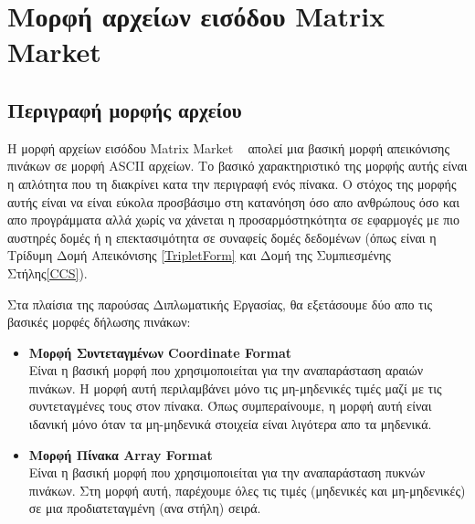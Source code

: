 
\chapter{Μορφή αρχείων εισόδου Matrix Market}
\label{ch:chapterMatrixMarketFormat}

\section {Περιγραφή μορφής αρχείου}
Η μορφή αρχείων εισόδου Matrix Market ~\cite{boisvert1996matrix} απολεί μια βασική μορφή απεικόνισης πινάκων σε μορφή  ASCII  αρχείων. Το βασικό χαρακτηριστικό της μορφής αυτής είναι η απλότητα που τη διακρίνει κατα την περιγραφή ενός πίνακα. Ο στόχος της μορφής αυτής είναι να είναι εύκολα προσβάσιμο στη κατανόηση όσο απο ανθρώπους όσο και απο προγράμματα αλλά χωρίς να χάνεται η προσαρμόστηκότητα σε εφαρμογές με πιο αυστηρές δομές ή η επεκτασιμότητα σε συναφείς δομές δεδομένων (όπως είναι η Τρίδυμη Δομή Απεικόνισης \ref{TripletForm} και Δομή της Συμπιεσμένης Στήλης\ref{CCS}).

Στα πλαίσια της παρούσας Διπλωματικής Εργασίας, θα εξετάσουμε δύο απο τις βασικές μορφές δήλωσης πινάκων:

\begin{itemize}
    \item \textbf{Μορφή Συντεταγμένων  Coordinate Format } \\
    Είναι η βασική μορφή που χρησιμοποιείται για την αναπαράσταση αραιών πινάκων. Η μορφή αυτή περιλαμβάνει μόνο τις μη-μηδενικές τιμές μαζί με τις συντεταγμένες τους στον πίνακα. Όπως συμπεραίνουμε, η μορφή αυτή είναι ιδανική μόνο όταν τα μη-μηδενικά στοιχεία είναι λιγότερα απο τα μηδενικά.
    \item \textbf{Μορφή Πίνακα  Array Format } \\
    Είναι η βασική μορφή που χρησιμοποιείται για την αναπαράσταση πυκνών πινάκων. Στη μορφή αυτή, παρέχουμε όλες τις τιμές (μηδενικές και μη-μηδενικές) σε μια προδιατεταγμένη (ανα στήλη) σειρά.
\end{itemize}

